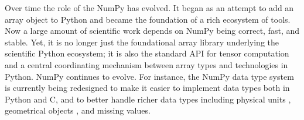 Over time the role of the NumPy has evolved.
It began as an attempt to add an array object to Python
and became the foundation of a rich ecosystem of tools.
Now a large amount of scientific work depends on NumPy
being correct, fast, and stable.
Yet, it is no longer just the foundational array library underlying the
scientific Python ecosystem; it is also the standard API for tensor
computation and a central coordinating mechanism between array types and
technologies in Python.
NumPy continues to evolve.
For instance, the NumPy data type system is currently being redesigned to make it
easier to implement data types both in Python and C, and to better handle
richer data types including physical units \cite{astropy,Goldbaum2018,pint},
geometrical objects \cite{pygeos}, and missing values.
